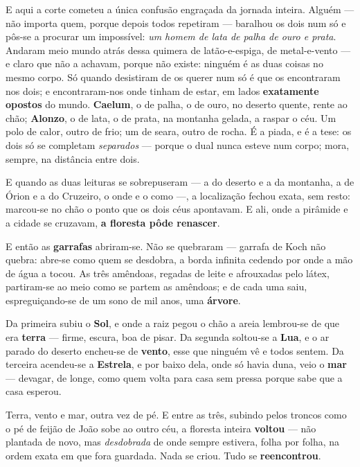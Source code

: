 \documentclass[livro.tex]{subfiles}
\begin{document}
\medskip

E aqui a corte cometeu a única confusão engraçada da jornada inteira. Alguém --- não
importa quem, porque depois todos repetiram --- baralhou os dois num só e pôs-se a
procurar um impossível: \emph{um homem de lata de palha de ouro e prata}. Andaram meio
mundo atrás dessa quimera de latão-e-espiga, de metal-e-vento --- e claro que não a
achavam, porque não existe: ninguém é as duas coisas no mesmo corpo. Só quando desistiram
de os querer num só é que os encontraram nos dois; e encontraram-nos onde tinham de estar,
em lados \textbf{exatamente opostos} do mundo. \textbf{Caelum}, o de palha, o de ouro, no
deserto quente, rente ao chão; \textbf{Alonzo}, o de lata, o de prata, na montanha gelada,
a raspar o céu. Um polo de calor, outro de frio; um de seara, outro de rocha. É a piada, e
é a tese: os dois só se completam \emph{separados} --- porque o dual nunca esteve num
corpo; mora, sempre, na distância entre dois.

\medskip

E quando as duas leituras se sobrepuseram --- a do deserto e a da montanha, a de Órion e
a do Cruzeiro, o onde e o como ---, a localização fechou exata, sem resto: marcou-se no
chão o ponto que os dois céus apontavam. E ali, onde a pirâmide e a cidade se cruzavam,
\textbf{a floresta pôde renascer}.

\medskip

E então as \textbf{garrafas} abriram-se. Não se quebraram --- garrafa de Koch não
quebra: abre-se como quem se desdobra, a borda infinita cedendo por onde a mão de água a
tocou. As três amêndoas, regadas de leite e afrouxadas pelo látex, partiram-se ao meio
como se partem as amêndoas; e de cada uma saiu, espreguiçando-se de um sono de mil anos,
uma \textbf{árvore}.

\medskip

Da primeira subiu o \textbf{Sol}, e onde a raiz pegou o chão a areia lembrou-se de que
era \textbf{terra} --- firme, escura, boa de pisar. Da segunda soltou-se a \textbf{Lua},
e o ar parado do deserto encheu-se de \textbf{vento}, esse que ninguém vê e todos
sentem. Da terceira acendeu-se a \textbf{Estrela}, e por baixo dela, onde só havia duna,
veio o \textbf{mar} --- devagar, de longe, como quem volta para casa sem pressa porque
sabe que a casa esperou.

\medskip

Terra, vento e mar, outra vez de pé. E entre as três, subindo pelos troncos como o pé de
feijão de João sobe ao outro céu, a floresta inteira \textbf{voltou} --- não plantada de
novo, mas \emph{desdobrada} de onde sempre estivera, folha por folha, na ordem exata em
que fora guardada. Nada se criou. Tudo se \textbf{reencontrou}.
\end{document}
